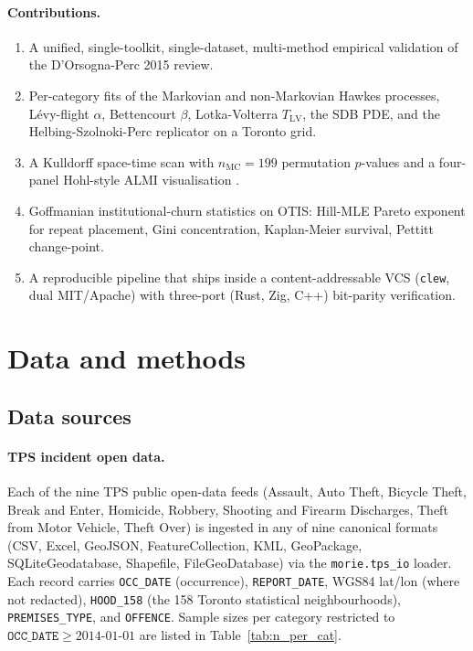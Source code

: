 \documentclass[11pt,a4paper]{article}
\newcommand{\1}{\mathbf{1}}
\theoremstyle{plain}
\theoremstyle{definition}
\begin{document}
\paragraph{Contributions.}
\begin{enumerate}
\setlength{\itemsep}{1pt}
  \item A unified, single-toolkit, single-dataset, multi-method
    empirical validation of the D'Orsogna-Perc 2015 review.
  \item Per-category fits of the Markovian and non-Markovian
    Hawkes processes, Lévy-flight $\alpha$, Bettencourt $\beta$,
    Lotka-Volterra $T_{\mathrm{LV}}$, the SDB PDE, and the
    Helbing-Szolnoki-Perc replicator on a Toronto grid.
  \item A Kulldorff space-time scan with $n_{\mathrm{MC}}=199$
    permutation $p$-values and a four-panel Hohl-style ALMI
    visualisation \cite{hohl2024almi}.
  \item Goffmanian institutional-churn statistics on OTIS:
    Hill-MLE Pareto exponent for repeat placement, Gini
    concentration, Kaplan-Meier survival, Pettitt change-point.
  \item A reproducible pipeline that ships inside a
    content-addressable VCS (\texttt{clew}, dual MIT/Apache) with
    three-port (Rust, Zig, C++) bit-parity verification.
\end{enumerate}

\section{Data and methods}\label{sec:methods}

\subsection{Data sources}\label{sec:data}

\paragraph{TPS incident open data.}  Each of the nine TPS public
open-data feeds (Assault, Auto Theft, Bicycle Theft, Break and
Enter, Homicide, Robbery, Shooting and Firearm Discharges, Theft
from Motor Vehicle, Theft Over) is ingested in any of nine canonical
formats (CSV, Excel, GeoJSON, FeatureCollection, KML, GeoPackage,
SQLiteGeodatabase, Shapefile, FileGeoDatabase) via the
\texttt{morie.tps\_io} loader.  Each record carries
\texttt{OCC\_DATE} (occurrence), \texttt{REPORT\_DATE}, WGS84
lat/lon (where not redacted), \texttt{HOOD\_158} (the 158 Toronto
statistical neighbourhoods), \texttt{PREMISES\_TYPE}, and
\texttt{OFFENCE}.  Sample sizes per category restricted to
$\texttt{OCC\_DATE} \ge 2014\text{-}01\text{-}01$ are listed in
Table~\ref{tab:n_per_cat}.
\end{document}
